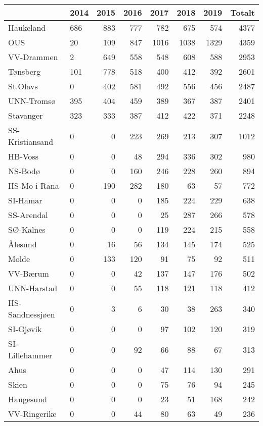 \documentclass[norsk,a4paper]{article}\usepackage[]{graphicx}\usepackage[]{color}
\begin{document}
\begin{table}[ht]
\centering
\begin{tabular}{llrrrrrr}
  \hline
 & 2014 & 2015 & 2016 & 2017 & 2018 & 2019 & Totalt \\ 
  \hline
Haukeland & 686 & 883 & 777 & 782 & 675 & 574 & 4377 \\ 
  OUS & 20 & 109 & 847 & 1016 & 1038 & 1329 & 4359 \\ 
  VV-Drammen & 2 & 649 & 558 & 548 & 608 & 588 & 2953 \\ 
  Tønsberg & 101 & 778 & 518 & 400 & 412 & 392 & 2601 \\ 
  St.Olavs & 0 & 402 & 581 & 492 & 556 & 456 & 2487 \\ 
  UNN-Tromsø & 395 & 404 & 459 & 389 & 367 & 387 & 2401 \\ 
  Stavanger & 323 & 333 & 387 & 412 & 422 & 371 & 2248 \\ 
  SS-Kristiansand & 0 & 0 & 223 & 269 & 213 & 307 & 1012 \\ 
  HB-Voss  & 0 & 0 & 48 & 294 & 336 & 302 & 980 \\ 
  NS-Bodø & 0 & 0 & 160 & 246 & 228 & 260 & 894 \\ 
  HS-Mo i Rana & 0 & 190 & 282 & 180 & 63 & 57 & 772 \\ 
  SI-Hamar & 0 & 0 & 0 & 185 & 224 & 229 & 638 \\ 
  SS-Arendal & 0 & 0 & 0 & 25 & 287 & 266 & 578 \\ 
  SØ-Kalnes & 0 & 0 & 0 & 119 & 224 & 215 & 558 \\ 
  Ålesund & 0 & 16 & 56 & 134 & 145 & 174 & 525 \\ 
  Molde & 0 & 133 & 120 & 91 & 75 & 92 & 511 \\ 
  VV-Bærum  & 0 & 0 & 42 & 137 & 147 & 176 & 502 \\ 
  UNN-Harstad & 0 & 0 & 55 & 118 & 121 & 118 & 412 \\ 
  HS-Sandnessjøen & 0 & 3 & 6 & 30 & 38 & 263 & 340 \\ 
  SI-Gjøvik & 0 & 0 & 0 & 97 & 102 & 120 & 319 \\ 
  SI-Lillehammer & 0 & 0 & 92 & 66 & 88 & 67 & 313 \\ 
  Ahus & 0 & 0 & 0 & 47 & 114 & 130 & 291 \\ 
  Skien & 0 & 0 & 0 & 75 & 76 & 94 & 245 \\ 
  Haugesund & 0 & 0 & 0 & 23 & 51 & 168 & 242 \\ 
  VV-Ringerike & 0 & 0 & 44 & 80 & 63 & 49 & 236 \\ 

\end{tabular}
\end{table}
\end{document}
